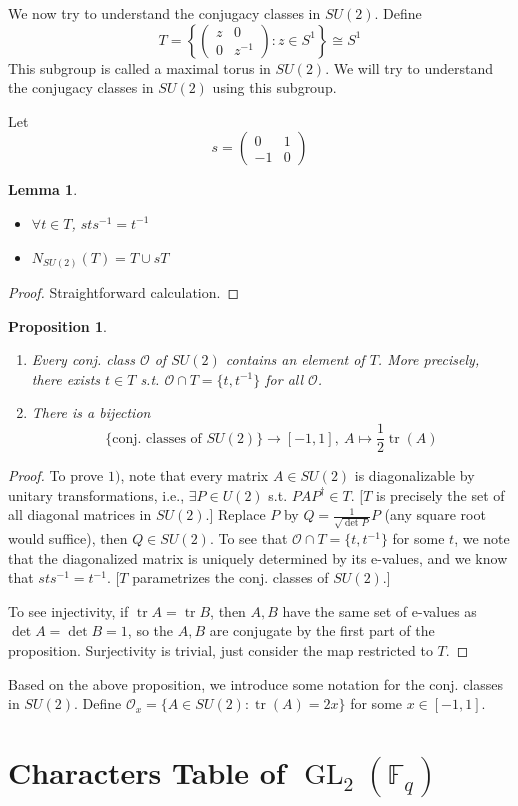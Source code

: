 \documentclass{article}
\theoremstyle{definition}
\theoremstyle{remark}
\theoremstyle{plain}
\newtheorem{lem}[defn]{Lemma}
\newtheorem{prop}[defn]{Proposition}
\newcommand{\FF}{\mathbb{F}}
\begin{document}
We now try to understand the conjugacy classes in $SU(2)$.
Define 
\[T=\left\{\begin{pmatrix}
    z&0\\0&z^{-1}
\end{pmatrix}:z\in S^1\right\}\cong S^1\]
This subgroup is called a maximal torus in $SU(2)$. We will try to understand the conjugacy classes in $SU(2)$ using this subgroup.

Let \[s=\begin{pmatrix}
    0&1\\-1&0
\end{pmatrix}\]
\begin{lem}
    \begin{itemize}
        \item $\forall t\in T$, $sts^{-1}=t^{-1}$
        \item $N_{SU(2)}(T)=T\cup sT$
    \end{itemize}
\end{lem}
\begin{proof}
    Straightforward calculation.
\end{proof}
\begin{prop}
\begin{enumerate}
    \item Every conj. class $\mathcal O$ of $SU(2)$ contains an element of $T$. More precisely, there exists $t\in T$ s.t. $\mathcal O\cap T=\{t,t^{-1}\}$ for all $\mathcal O$.
    \item There is a bijection
    \[\{\text{conj. classes of }SU(2)\}\rightarrow[-1,1],\ A\mapsto \dfrac{1}{2}\operatorname{tr}(A)\]
\end{enumerate}
\end{prop}
\begin{proof}
    To prove $1)$, note that every matrix $A\in SU(2)$ is diagonalizable by unitary transformations, i.e., $\exists P\in U(2)$ s.t. $PAP^\dagger\in T$. [$T$ is precisely the set of all diagonal matrices in $SU(2)$.] Replace $P$ by $Q=\frac{1}{\sqrt{\det P}}P$ (any square root would suffice), then $Q\in SU(2)$. To see that $\mathcal O\cap T=\{t,t^{-1}\}$ for some $t$, we note that the diagonalized matrix is uniquely determined by its e-values, and we know that $sts^{-1}=t^{-1}$. [$T$ parametrizes the conj. classes of $SU(2)$.]

    To see injectivity, if $\operatorname{tr}A=\operatorname{tr} B$, then $A,B$ have the same set of e-values as $\det A=\det B=1$, so the $A,B$ are conjugate by the first part of the proposition. Surjectivity is trivial, just consider the map restricted to $T$.
\end{proof}
Based on the above proposition, we introduce some notation for the conj. classes in $SU(2)$.
Define $\mathcal O_x=\{A\in SU(2):\operatorname{tr}(A)=2x\}$ for some $x\in[-1,1]$.

\section{Characters Table of $\operatorname{GL}_2(\FF_q)$}
\end{document}
